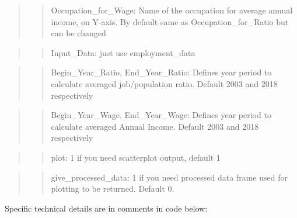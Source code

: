 \documentclass[
]{article}
\begin{document}
\begin{quote}
\begin{quote}
Occupation\_for\_Wage: Name of the occupation for average annual income,
on Y-axis. By default same as Occupation\_for\_Ratio but can be changed
\end{quote}
\end{quote}

\begin{quote}
\begin{quote}
Input\_Data: just use employment\_data
\end{quote}
\end{quote}

\begin{quote}
\begin{quote}
Begin\_Year\_Ratio, End\_Year\_Ratio: Defines year period to calculate
averaged job/population ratio. Default 2003 and 2018 respectively
\end{quote}
\end{quote}

\begin{quote}
\begin{quote}
Begin\_Year\_Wage, End\_Year\_Wage: Defines year period to calculate
averaged Annual Income. Default 2003 and 2018 respectively
\end{quote}
\end{quote}

\begin{quote}
\begin{quote}
plot: 1 if you need scatterplot output, default 1
\end{quote}
\end{quote}

\begin{quote}
\begin{quote}
give\_processed\_data: 1 if you need processed data frame used for
plotting to be returned. Default 0.
\end{quote}
\end{quote}

Specific technical details are in comments in code below:
\end{document}

